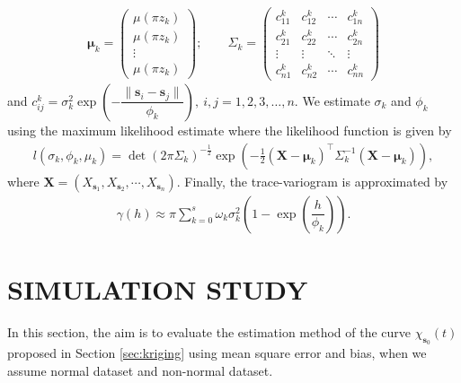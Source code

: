 \documentclass[12pt,]{article}
\theoremstyle{definition}
\theoremstyle{definition}
\theoremstyle{definition}
\theoremstyle{remark}
\begin{document}
\begin{align*}
 \bm{\mu}_k = \begin{pmatrix}
             \mu(\pi z_k)\\
             \mu(\pi z_k)\\
             \vdots\\
             \mu(\pi z_k)
            \end{pmatrix};
            \qquad
    \Sigma_k = \begin{pmatrix}
              c_{11}^k & c_{12}^k & \cdots & c_{1n}^k\\
              c_{21}^k & c_{22}^k & \cdots & c_{2n}^k\\
              \vdots & \vdots & \ddots & \vdots \\
              c_{n1}^k & c_{n2}^k & \cdots & c_{nn}^k
             \end{pmatrix}
\end{align*}
and \(c_{ij}^k = \sigma_k^2 \exp \left( -\dfrac{\lVert \bm{s}_i -\bm{s}_j\rVert}{\phi_k} \right),\ i,j=1,2,3,\dots, n\).
We estimate \(\sigma_k\) and \(\phi_k\) using the maximum likelihood estimate where the likelihood function is given by
\begin{align*}
 l(\sigma_k, \phi_k, \mu_k) = \det (2 \pi \Sigma_k)^{-\frac{1}{2}} \exp \left(  -\frac{1}{2} (\bm{X}-\bm{\mu}_k)^\top \Sigma_k^{-1} (\bm{X}-\bm{\mu}_k) \right),
\end{align*}
where \(\bm{X} = \left( X_{\bm{s}_1}, X_{\bm{s}_2}, \cdots, X_{\bm{s}_n} \right)\). Finally, the trace-variogram is approximated by
\begin{align*}
 \gamma(h) \approx \pi \sum_{k=0}^{s} \omega_k \sigma_k^2\left(1- \exp \left( \dfrac{h}{\phi_k} \right) \right).
\end{align*}

\hypertarget{sec:simulation}{%
\section{SIMULATION STUDY}\label{sec:simulation}}

In this section, the aim is to evaluate the estimation method of the curve \(\chi_{\bm{s}_0}(t)\) proposed in Section \ref{sec:kriging} using mean square error and bias, when we assume normal dataset and non-normal dataset.
\end{document}

